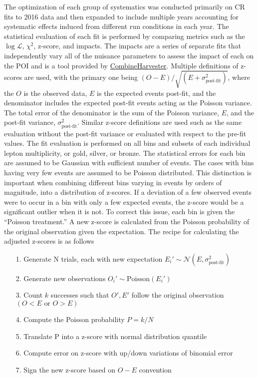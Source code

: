 The optimization of each group of systematics was conducted primarily on CR fits to 2016 data and then expanded to include multiple years accounting for systematic effects induced from different run conditions in each year. The statistical evaluation of each fit is performed by comparing metrics such as the $\log\mathcal{L}$, $\chi^2$, z-score, and impacts. The impacts are a series of separate fits that independently vary all of the nuisance parameters to assess the impact of each on the POI and is a tool provided by \url{CombineHarvester}. Multiple definitions of z-scores are used, with the primary one being $ (O-E)/\sqrt{(E+\sigma_{\text{post-fit}}^2)}$, where the $O$ is the observed data, $E$ is the expected events post-fit, and the denominator includes the expected post-fit events acting as the Poisson variance. The total error of the denominator is the sum of the Poisson variance, $E$, and the post-fit variance, $\sigma_{\text{post-fit}}^2$. Similar z-score definitions are used such as the same evaluation without the post-fit variance or evaluated with respect to the pre-fit values. The fit evaluation is performed on all bins and subsets of each individual lepton multiplicity, or gold, silver, or bronze. The statistical errors for each bin are assumed to be Gaussian with sufficient number of events. The cases with bins having very few events are assumed to be Poisson distributed. This distinction is important when combining different bins varying in events by orders of magnitude, into a distribution of z-scores. If a deviation of a few observed events were to occur in a bin with only a few expected events, the z-score would be a significant outlier when it is not. To correct this issue, each bin is given the ``Poisson treatment.'' A new z-score is calculated from the Poisson probability of the original observation given the expectation. The recipe for calculating the adjusted z-scores is as follows
\begin{itemize}
\item[1.] Generate N trials, each with new expectation $E_i' \sim \mathcal{N}(E,\sigma_{\text{post-fit}}^2)$
\item[2.] Generate new observations $O_i'\sim \text{Poisson}(E_i')$
\item[3.] Count $k$ successes such that $O',E'$ follow the original observation $(O<E \,\, \text{or} \, \, O>E)$
\item[4.] Compute the Poisson probability $P=k/N$ 
\item[5.] Translate P into a z-score with normal distribution quantile
\item[6.] Compute error on z-score with up/down variations of binomial error
\item[7.] Sign the new z-score based on $O-E$ convention
\end{itemize} 

